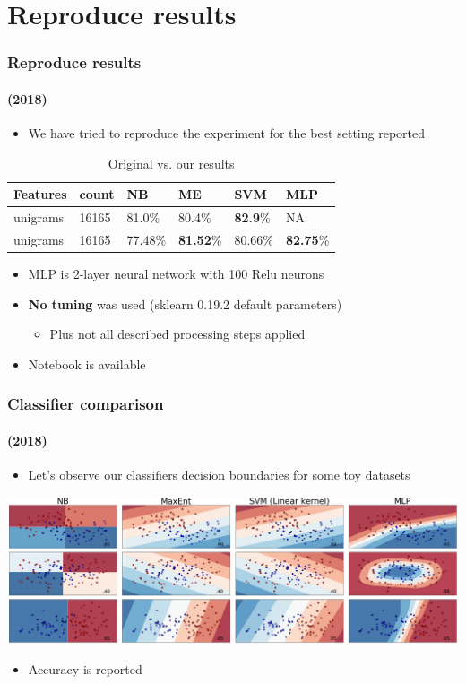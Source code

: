\documentclass{beamer}
\begin{document}
\section{Reproduce results}
\begin{frame}
	\frametitle{Reproduce results}
	\framesubtitle{(2018)}
	\begin{itemize}
		\item We have tried to reproduce the experiment for the best setting reported
	\end{itemize}
	\begin{center}
		\begin{table}
			\begin{tabular}{l | l | l || l | l | l}
				Features & count & NB & ME & SVM & MLP\\ \hline \hline
				unigrams & 16165 & 81.0\% & 80.4\% & \textbf{82.9}\% & NA \pause \\
				unigrams & 16165 & 77.48\% & \textbf{81.52}\% & 80.66\% & \textbf{82.75}\%  \\
			\end{tabular}
			\caption{Original vs. our results}
		\end{table}
	\end{center} \pause
	\begin{itemize}
		\item MLP is 2-layer neural network with 100 Relu neurons
		\item \textbf{No tuning} was used (sklearn 0.19.2 default parameters)
		\begin{itemize}
			\item Plus not all described processing steps applied 
		\end{itemize}
		\item Notebook is available \href{https://github.com/dorcoh/sentiment-emnlp/blob/master/experiment/sentiment-analysis-emnlp2002.ipynb}{}
	\end{itemize}
\end{frame}

\begin{frame}
	\frametitle{Classifier comparison}
	\framesubtitle{(2018)}
	\begin{itemize}
		\item Let's observe our classifiers decision boundaries for some toy datasets \pause
	\end{itemize}
	\begin{center}
		\includegraphics[scale=0.26]{comparison}
	\end{center}
	\begin{itemize}
		\item Accuracy is reported
	\end{itemize}
\end{frame}
\end{document}
